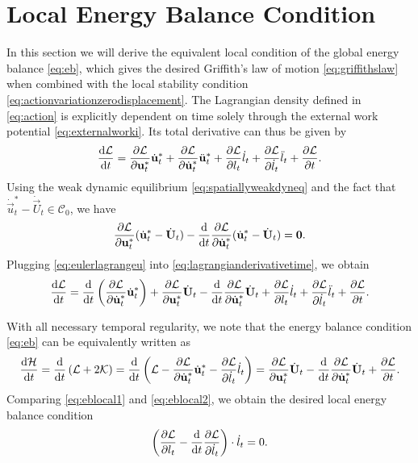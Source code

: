 \section{Local Energy Balance Condition} \label{sec:ebcalc}
In this section we will derive the equivalent local condition of the global energy balance \eqref{eq:eb}, which gives the desired Griffith's law of motion \eqref{eq:griffithslaw} when combined with the local stability condition \eqref{eq:actionvariationzerodisplacement}. The Lagrangian density defined in \eqref{eq:action} is explicitly dependent on time solely through the external work potential \eqref{eq:externalworki}. Its total derivative can thus be given by
\begin{equation} \label{eq:lagrangianderivativetime}
\frac{\md\mathcal{L}}{\md t}=\frac{\partial\mathcal{L}}{\partial\vec{u}_t^*}\dot{\vec{u}}_t^*+\frac{\partial\mathcal{L}}{\partial\dot{\vec{u}}_t^*}\ddot{\vec{u}}_t^*+\frac{\partial\mathcal{L}}{\partial l_t}\dot{l}_t+\frac{\partial\mathcal{L}}{\partial\dot{l}_t}\ddot{l}_t+\frac{\partial\mathcal{L}}{\partial t}.
\end{equation}
Using the weak dynamic equilibrium \eqref{eq:spatiallyweakdyneq} and the fact that $\dot{\vec{u}}_t^*-\dot{\vec{U}}_t\in\mathcal{C}_0$, we have
\begin{equation} \label{eq:eulerlagrangeu}
\frac{\partial\mathcal{L}}{\partial\vec{u}_t^*}(\dot{\vec{u}}_t^*-\dot{\vec{U}}_t)-\frac{\md}{\md t}\frac{\partial\mathcal{L}}{\partial\dot{\vec{u}}_t^*}(\dot{\vec{u}}_t^*-\dot{\vec{U}}_t)=\vec{0}.
\end{equation}
Plugging \eqref{eq:eulerlagrangeu} into \eqref{eq:lagrangianderivativetime}, we obtain
\begin{equation} \label{eq:eblocal1}
\frac{\md\mathcal{L}}{\md t}=\frac{\md}{\md t}\left(\frac{\partial\mathcal{L}}{\partial\dot{\vec{u}}_t^*}\dot{\vec{u}}_t^*\right)+\frac{\partial\mathcal{L}}{\partial\vec{u}_t^*}\dot{\vec{U}}_t-\frac{\md}{\md t}\frac{\partial\mathcal{L}}{\partial\dot{\vec{u}}_t^*}\dot{\vec{U}}_t+\frac{\partial\mathcal{L}}{\partial l_t}\dot{l}_t+\frac{\partial\mathcal{L}}{\partial\dot{l}_t}\ddot{l}_t+\frac{\partial\mathcal{L}}{\partial t}.
\end{equation}

With all necessary temporal regularity, we note that the energy balance condition \eqref{eq:eb} can be equivalently written as
\begin{equation} \label{eq:eblocal2}
\frac{\md\mathcal{H}}{\md t}=\frac{\md}{\md t}\left(\mathcal{L}+2\mathcal{K}\right)=\frac{\md}{\md t}\left(\mathcal{L}-\frac{\partial\mathcal{L}}{\partial\dot{\vec{u}}_t^*}\dot{\vec{u}}_t^*-\frac{\partial\mathcal{L}}{\partial\dot{l}_t}\dot{l}_t\right)=\frac{\partial\mathcal{L}}{\partial\vec{u}_t^*}\dot{\vec{U}}_t-\frac{\md}{\md t}\frac{\partial\mathcal{L}}{\partial\dot{\vec{u}}_t^*}\dot{\vec{U}}_t+\frac{\partial\mathcal{L}}{\partial t}.
\end{equation}
Comparing \eqref{eq:eblocal1} and \eqref{eq:eblocal2}, we obtain the desired local energy balance condition
\[
\left(\frac{\partial\mathcal{L}}{\partial l_t}-\frac{\mathrm{d}}{\mathrm{d} t}\frac{\partial\mathcal{L}}{\partial\dot{l}_t}\right)\cdot\dot{l}_t=0.
\]

